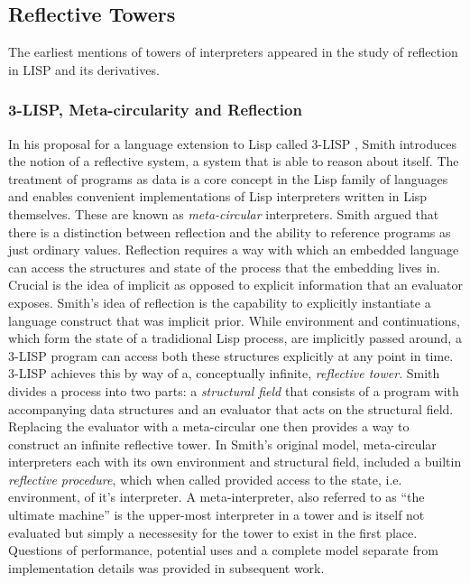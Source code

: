\documentclass{article}
\theoremstyle{definition}
\begin{document}
\subsection{Reflective Towers}
The earliest mentions of towers of interpreters appeared in the study of reflection in LISP and its derivatives.

\subsubsection{3-LISP, Meta-circularity and Reflection}
In his proposal for a language extension to Lisp called 3-LISP \cite{smith1984reflection}, Smith introduces the notion of a reflective system, a system that is able to reason about itself. The treatment of programs as data is a core concept in the Lisp family of languages and enables  convenient implementations of Lisp interpreters written in Lisp themselves. These are known as \textit{meta-circular} interpreters. Smith argued that there is a distinction between reflection and the ability to reference programs as just ordinary values. Reflection requires a way with which an embedded language can access the structures and state of the process that the embedding lives in. Crucial is the idea of implicit as opposed to explicit information that an evaluator exposes. Smith's idea of reflection is the capability to explicitly instantiate a language construct that was implicit prior. While environment and continuations, which form the state of a tradidional Lisp process, are implicitly passed around, a 3-LISP program can access both these structures explicitly at any point in time. 3-LISP achieves this by way of a, conceptually infinite, \textit{reflective tower}. Smith divides a process into two parts: a \textit{structural field} that consists of a program with accompanying data structures and an evaluator that acts on the structural field. Replacing the evaluator with a meta-circular one then provides a way to construct an infinite reflective tower. In Smith's original model, meta-circular interpreters each with its own environment and structural field, included a builtin \textit{reflective procedure}, which when called provided access to the state, i.e. environment, of it's interpreter. A meta-interpreter, also referred to as ``the ultimate machine'' is the upper-most interpreter in a tower and is itself not evaluated but simply a necessesity for the tower to exist in the first place. Questions of performance, potential uses and a complete model separate from implementation details was provided in subsequent work.
\end{document}
